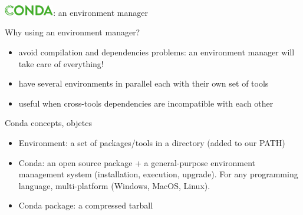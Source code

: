%
\begin{frame}{\includegraphics[height=0.5cm]{shared/logo-conda.png}: an environment manager}
\begin{block}{Why using an environment manager?}
\begin{itemize}
    \item avoid compilation and dependencies problems: an environment manager will take care of everything!
    \item have several environments in parallel each with their own set of tools
    \item useful when cross-tools dependencies are incompatible with each other
\end{itemize}
\end{block}
\begin{block}{Conda concepts, objetcs}
    \begin{itemize}
        \item Environment: a set of packages/tools in a directory (added to our PATH)
        \item Conda: an open source package + a general-purpose environment management system (installation, execution, upgrade). For any programming language, multi-platform (Windows, MacOS, Linux).
        \item Conda package: a compressed tarball
    \end{itemize}
\end{block}
\end{frame}
